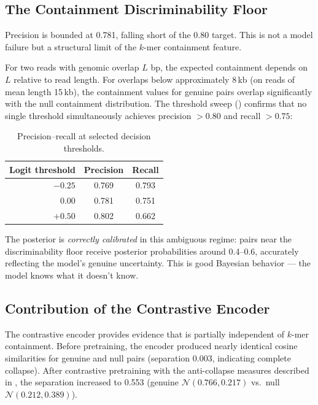 \documentclass[11pt,a4paper]{article}
\begin{document}
\subsection{The Containment Discriminability Floor}
\label{sec:disc-floor}

Precision is bounded at 0.781, falling short of the 0.80 target.  This
is not a model failure but a structural limit of the $k$-mer
containment feature.

For two reads with genomic overlap $L$ bp, the expected containment
depends on $L$ relative to read length.  For overlaps below
approximately 8\,kb (on reads of mean length 15\,kb), the containment
values for genuine pairs overlap significantly with the null
containment distribution.  The threshold sweep ()
confirms that no single threshold simultaneously achieves precision
$> 0.80$ and recall $> 0.75$:

\begin{table}[ht]
  \centering
  \caption{Precision--recall at selected decision thresholds.}
  \label{tab:threshold}
  \begin{tabular}{rcc}
    \toprule
    Logit threshold & Precision & Recall \\
    \midrule
    $-0.25$ & 0.769 & 0.793 \\
    $\phantom{-}0.00$ & 0.781 & 0.751 \\
    $+0.50$ & 0.802 & 0.662 \\
    \bottomrule
  \end{tabular}
\end{table}

The posterior is \emph{correctly calibrated} in this ambiguous regime:
pairs near the discriminability floor receive posterior probabilities
around 0.4--0.6, accurately reflecting the model's genuine uncertainty.
This is good Bayesian behavior --- the model knows what it doesn't know.

\subsection{Contribution of the Contrastive Encoder}

The contrastive encoder provides evidence that is partially independent
of $k$-mer containment.  Before pretraining, the encoder produced
nearly identical cosine similarities for genuine and null pairs
(separation 0.003, indicating complete collapse).  After contrastive
pretraining with the anti-collapse measures described in
, the separation increased to 0.553 (genuine
$\mathcal{N}(0.766, 0.217)$ vs.\ null $\mathcal{N}(0.212, 0.389)$).
\end{document}
